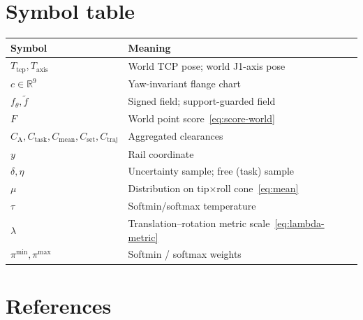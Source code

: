 \documentclass[11pt,a4paper]{article}
\newcommand{\R}{\mathbb{R}}
\newcommand{\Tcp}{T_{\mathrm{tcp}}}
\newcommand{\Taxis}{T_{\mathrm{axis}}}
\begin{document}
\section{Symbol table}
\label{sec:symbols}

\begin{center}
\begin{tabular}{@{}ll@{}}
\toprule
Symbol & Meaning \\
\midrule
\(\Tcp,\Taxis\) & World TCP pose; world J1-axis pose \\
\(c\in\R^{9}\) & Yaw-invariant flange chart \\
\(f_{\theta},\tilde f\) & Signed field; support-guarded field \\
\(F\) & World point score~\eqref{eq:score-world} \\
\(C_{\mathrm{A}},C_{\mathrm{task}},C_{\mathrm{mean}},C_{\mathrm{set}},C_{\mathrm{traj}}\) &
  Aggregated clearances \\
\(y\) & Rail coordinate \\
\(\delta,\eta\) & Uncertainty sample; free (task) sample \\
\(\mu\) & Distribution on tip$\times$roll cone~\eqref{eq:mean} \\
\(\tau\) & Softmin/softmax temperature \\
\(\lambda\) & Translation--rotation metric scale~\eqref{eq:lambda-metric} \\
\(\pi^{\mathrm{min}},\pi^{\mathrm{max}}\) & Softmin / softmax weights \\
\bottomrule
\end{tabular}
\end{center}

\section{References}
\label{sec:refs}
\end{document}
